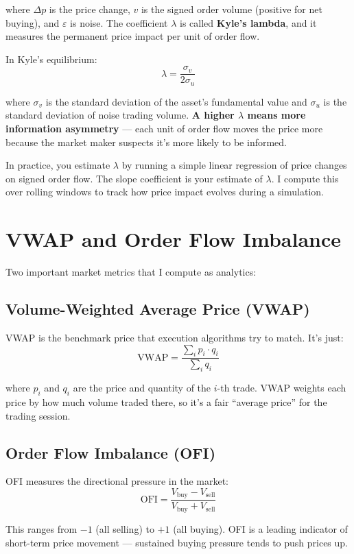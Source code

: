 \documentclass[11pt]{article}
\begin{document}
where $\Delta p$ is the price change, $v$ is the signed order volume (positive for net buying), and $\varepsilon$ is noise. The coefficient $\lambda$ is called \textbf{Kyle's lambda}, and it measures the permanent price impact per unit of order flow.

In Kyle's equilibrium:
\[
    \lambda = \frac{\sigma_v}{2\sigma_u}
\]

where $\sigma_v$ is the standard deviation of the asset's fundamental value and $\sigma_u$ is the standard deviation of noise trading volume. \textbf{A higher $\lambda$ means more information asymmetry} --- each unit of order flow moves the price more because the market maker suspects it's more likely to be informed.

In practice, you estimate $\lambda$ by running a simple linear regression of price changes on signed order flow. The slope coefficient is your estimate of $\lambda$. I compute this over rolling windows to track how price impact evolves during a simulation.

\section{VWAP and Order Flow Imbalance}

Two important market metrics that I compute as analytics:

\subsection{Volume-Weighted Average Price (VWAP)}

VWAP is the benchmark price that execution algorithms try to match. It's just:
\[
    \text{VWAP} = \frac{\sum_{i} p_i \cdot q_i}{\sum_{i} q_i}
\]

where $p_i$ and $q_i$ are the price and quantity of the $i$-th trade. VWAP weights each price by how much volume traded there, so it's a fair ``average price'' for the trading session.

\subsection{Order Flow Imbalance (OFI)}

OFI measures the directional pressure in the market:
\[
    \text{OFI} = \frac{V_{\text{buy}} - V_{\text{sell}}}{V_{\text{buy}} + V_{\text{sell}}}
\]

This ranges from $-1$ (all selling) to $+1$ (all buying). OFI is a leading indicator of short-term price movement --- sustained buying pressure tends to push prices up.
\end{document}
